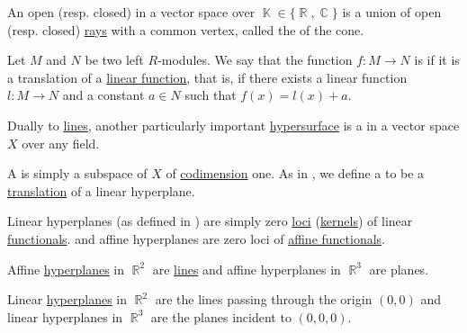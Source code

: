 \begin{definition}\label{def:geometric_cone}
  An open (resp. closed)  in a vector space over \( \BbbK \in \{ \BbbR, \BbbC \} \) is a union of open (resp. closed) \hyperref[def:geometric_ray]{rays} with a common vertex, called the  of the cone.
\end{definition}

\begin{definition}\label{def:affine_operator}
  Let \( M \) and \( N \) be two left \( R \)-modules. We say that the function \( f: M \to N \) is  if it is a translation of a \hyperref[def:semimodule/homomorphism]{linear function}, that is, if there exists a linear function \( l: M \to N \) and a constant \( a \in N \) such that \( f(x) = l(x) + a \).
\end{definition}

\begin{definition}\label{def:hyperplane}
  Dually to \hyperref[def:geometric_line]{lines}, another particularly important \hyperref[def:hypersurface]{hypersurface} is a  in a vector space \( X \) over any field.

  \begin{thmenum}
     A  is simply a subspace of \( X \) of \hyperref[def:vector_space_dimension]{codimension} one. As in , we define a  to be a \hyperref[def:euclidean_transformation/translation]{translation} of a linear hyperplane.

     Linear hyperplanes (as defined in ) are simply zero \hyperref[def:zero_locus]{loci} (\hyperref[def:semiring_kernel]{kernels}) of linear \hyperref[def:semimodule/homomorphism]{functionals}. and affine hyperplanes are zero loci of \hyperref[def:affine_operator]{affine functionals}.
  \end{thmenum}
\end{definition}

\begin{example}\label{ex:hyperplanes}
  Affine \hyperref[def:hyperplane]{hyperplanes} in \( \BbbR^2 \) are \hyperref[def:geometric_line]{lines} and affine hyperplanes in \( \BbbR^3 \) are planes.

  Linear \hyperref[def:hyperplane]{hyperplanes} in \( \BbbR^2 \) are the lines passing through the origin \( (0, 0) \) and linear hyperplanes in \( \BbbR^3 \) are the planes incident to \( (0, 0, 0) \).
\end{example}

